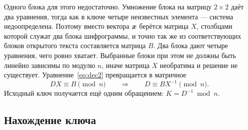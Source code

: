 \documentclass[a4paper,14pt]{extarticle}
\begin{document}
Одного блока для этого недостаточно. Умножение блока на матрицу $2\times2$ даёт
два уравнения, тогда как в ключе четыре неизвестных элемента --- система
недоопределена. Поэтому вместо вектора $\boldsymbol{x}$ берётся матрица $X$, столбцами
которой служат два блока шифрограммы, и точно так же из соответствующих блоков
открытого текста составляется матрица $B$. Два блока дают четыре уравнения,
чего ровно хватает. Выбранные блоки при этом не должны быть линейно зависимы
по модулю $n$, иначе матрица $X$ необратима и решение не существует.
Уравнение~\eqref{eq:dec2} превращается в матричное
\begin{equation}
  D X \equiv B \pmod n \qquad\Longrightarrow\qquad D \equiv B X^{-1} \pmod n .
  \label{eq:attack}
\end{equation}
Исходный ключ получается ещё одним обращением: $K = D^{-1} \bmod n$.

\subsection{Нахождение ключа}
\end{document}
